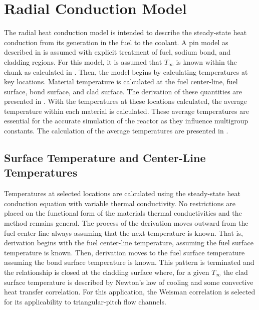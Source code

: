 \section{Radial Conduction Model}
  \label{sec:radial_conduction_model}
  The radial heat conduction model is intended to describe the steady-state heat
  conduction from its generation in the fuel to the coolant. A pin model as
  described in  is assumed with explicit treatment of
  fuel, sodium bond, and cladding regions. For this model, it is assumed that
  $T_{\infty}$ is known within the chunk as calculated in
  . Then, the model begins by calculating
  temperatures at key locations. Material temperature is calculated at the fuel
  center-line, fuel surface, bond surface, and clad surface. The derivation of
  these quantities are presented in . With the
  temperatures at these locations calculated, the average temperature within
  each material is calculated. These average temperatures are essential for the
  accurate simulation of the reactor as they influence multigroup constants. The
  calculation of the average temperatures are presented in
  .

  \subsection{Surface Temperature and Center-Line Temperatures}
    \label{sec:surface_temps}
    Temperatures at selected locations are calculated using the steady-state
    heat conduction equation with variable thermal conductivity. No restrictions
    are placed on the functional form of the materials thermal conductivities
    and the method remains general. The process of the derivation moves outward
    from the fuel center-line always assuming that the next temperature is
    known. That is, derivation begins with the fuel center-line temperature,
    assuming the fuel surface temperature is known. Then, derivation moves to
    the fuel surface temperature assuming the bond surface temperature is known.
    This pattern is terminated and the relationship is closed at the cladding
    surface where, for a given $T_{\infty}$ the clad surface temperature is
    described by Newton's law of cooling and some convective heat transfer
    correlation. For this application, the Weisman correlation is selected for
    its applicability to triangular-pitch flow channels.


